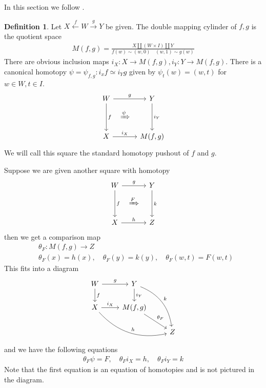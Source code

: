 \documentclass{scrartcl}
\theoremstyle{plain}
\theoremstyle{definition}
\newtheorem{definition}[theorem]{Definition}
\renewcommand{\coprod}{\mathbin{\amalg}}
\begin{document}
In this section we follow \cite[1.2]{may2011more}.  
\begin{definition}
    Let $X\xleftarrow{f}W\xrightarrow{g}Y$ be given. The double mapping cylinder of $f, g$ is the quotient space
    \begin{align*}
        M(f, g) = \frac{X\coprod(W\times I)\coprod Y}{f(w)\sim (w,0)\quad (w, 1)\sim g(w)}
    \end{align*}
    There are obvious inclusion maps $i_X\colon X\to M(f, g), i_Y\colon Y\to M(f, g)$. There is a canonical homotopy $\psi=\psi_{f, g}\colon i_xf\simeq i_Yg$ given by $\psi_t(w) = (w, t)$ for $w\in W, t\in I$. 
    \begin{equation}
        \begin{tikzcd}[column sep=.2cm, row sep=.2cm]
            W \arrow[rr,"g"]\arrow[dd,"f"] && Y \arrow[dd, "i_Y"] \\
            & \xRightarrow{\psi} & \\
            X \arrow[rr, "i_X"] && M(f, g)
        \end{tikzcd}
    \end{equation}
    We will call this square the standard homotopy pushout of $f$ and $g$.
\end{definition}

Suppose we are given another square with homotopy
\begin{equation}\label{diag:square_with_homotopy}
    \begin{tikzcd}[column sep=.2cm, row sep=.2cm]
        W \arrow[rr,"g"]\arrow[dd,"f"] && Y \arrow[dd, "k"] \\
        & \xRightarrow{F} & \\
        X \arrow[rr, "h"] && Z
    \end{tikzcd}
\end{equation}
then we get a comparison map 
\begin{align*}
    &\theta_F\colon M(f,g)\to Z \\
    &\theta_F(x) = h(x), \quad \theta_F(y) = k(y), \quad \theta_F(w, t) = F(w, t)
\end{align*}
This fits into a diagram
\begin{equation}
    \begin{tikzcd}
    W \ar[r, "g"] \ar[d, "f"]  &  Y \ar[d, "i_Y"] \ar[ddr, bend left, "k"]  & \\
    X \ar[r, "i_X"] \ar[drr, bend right, "h"]  &  M(f, g) \ar[dr, "\theta_F"]  &  \\
    &  &  Z
\end{tikzcd}
\end{equation}
and we have the following equations
\begin{align*}
    \theta_F \psi = F, \quad \theta_F i_X = h, \quad \theta_F i_Y = k
\end{align*}
Note that the first equation is an equation of homotopies and is not pictured in the diagram. 
\end{document}
